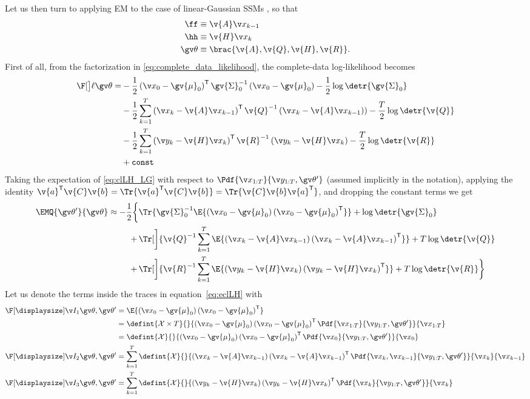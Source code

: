 Let us then turn to applying EM to the case of linear-Gaussian SSMs
\parencite{shumway1982approach,Ghahramani1996}
, so that
\begin{align}
	\ff &\equiv \v{A}\xkk\\
	\hh &\equiv \v{H}\xk\\
	\Th &\equiv \brac{\v{A},\v{Q},\v{H},\v{R}}.
	\label{tablelabel}
\end{align}
First of all, from the factorization in \eqref{eq:complete_data_likelihood}, the complete-data log-likelihood becomes
\begin{align}
\label{eq:clLH_LG}
\begin{split}
	\lLH
	=&-\frac{1}{2}\left(\x_0-\gv{\mu}_0\right)^\tr\gv{\Sigma}_0^{-1}\left(\x_0-\gv{\mu}_0\right)-\frac{1}{2}\log\detr{\gv{\Sigma}_0}\\
	&-\frac{1}{2}\sum_{k=1}^T\left(\x_k-\v{A}\xkk\right)^\tr\v{Q}^{-1}\left(\x_k-\v{A}\xkk)\right)-\frac{T}{2}\log\detr{\v{Q}}\\
	&-\frac{1}{2}\sum_{k=1}^T\left(\y_k-\v{H}\xk\right)^\tr\v{R}^{-1}\left(\y_k-\v{H}\xk\right)-\frac{T}{2}\log\detr{\v{R}}\\
	&+\mathtt{const}
\end{split}
\end{align}
Taking the expectation of \eqref{eq:clLH_LG} with respect to $\Pdf{\X}{\Y,\Th'}$ (assumed implicitly in the notation),
applying the identity $\v{a}^\tr\v{C}\v{b}=\Tr{\v{a}^\tr\v{C}\v{b}}=\Tr{\v{C}\v{b}\v{a}^\tr}$, and dropping the constant terms we get
\begin{align}
\begin{split}
	\EMQ{\Th'}{\Th} \approx -\frac{1}{2}\bigg\{&\Tr{\gv{\Sigma}_0^{-1}\E{\left(\x_0-\gv{\mu}_0\right)\left(\x_0-\gv{\mu}_0\right)^\tr}}+\log\detr{\gv{\Sigma}_0}\\
	+\,&\Tr[\bigg]{\v{Q}^{-1}\sum_{k=1}^T\E{\left(\x_k-\v{A}\xkk\right)\left(\x_k-\v{A}\xkk\right)^\tr}}+T\log\detr{\v{Q}}\\
	+\,&\Tr[\bigg]{\v{R}^{-1}\sum_{k=1}^T\E{\left(\y_k-\v{H}\xk\right)\left(\y_k-\v{H}\xk\right)^\tr}}+T\log\detr{\v{R}}\bigg\}
\end{split}
\label{eq:eclLH}
\end{align} 
Let us denote the terms inside the traces in equation~\eqref{eq:eclLH} with
\begin{align}
	\II{1} &= \E{\left(\x_0-\gv{\mu}_0\right)\left(\x_0-\gv{\mu}_0\right)^\tr}\\ 
	&=\defint{\mathcal{X}\times T}{}{\left(\x_0-\gv{\mu}_0\right)\left(\x_0-\gv{\mu}_0\right)^\tr\Pdf{\X}{\Y,\Th'}}{\X}\nonumber\\
	&= 	\defint{\mathcal{X}}{}{\left(\x_0-\gv{\mu}_0\right)\left(\x_0-\gv{\mu}_0\right)^\tr\Pdf{\x_0}{\Y,\Th'}}{\x_0} \label{eq:I1_general}\\
	\II{2} &= \sum_{k=1}^T\defint{\mathcal{X}}{}{\left(\x_k-\v{A}\xkk\right)\left(\x_k-\v{A}\xkk\right)^\tr\Pdf{\xk,\xkk}{\Y,\Th'}}{\xk}{\xkk} \label{eq:I2_general}\\
	\II{3} &=
	\sum_{k=1}^T\defint{\mathcal{X}}{}{\left(\y_k-\v{H}\xk\right)\left(\y_k-\v{H}\xk\right)^\tr\Pdf{\xk}{\Y,\Th'}}{\xk}
	\label{eq:I3_general} \end{align}%
